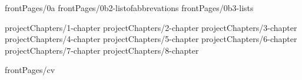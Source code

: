 \documentclass[a4paper,12pt,oneside,openany]{book}
\begin{document}
\onehalfspacing
{}

 {frontPages/0a}
 {frontPages/0b2-listofabbrevations}
 {frontPages/0b3-lists}

\onehalfspacing
\clearpage
{}

 {projectChapters/1-chapter}
 {projectChapters/2-chapter}
 {projectChapters/3-chapter}
 {projectChapters/4-chapter}
 {projectChapters/5-chapter}
 {projectChapters/6-chapter}
 {projectChapters/7-chapter}
 {projectChapters/8-chapter}

\newpage\appendix


\newpage
{}
\singlespacing
\printbibliography[title={\bibName}]

\ifnum{}
\newpage
 {frontPages/cv}
\fi
\end{document}
